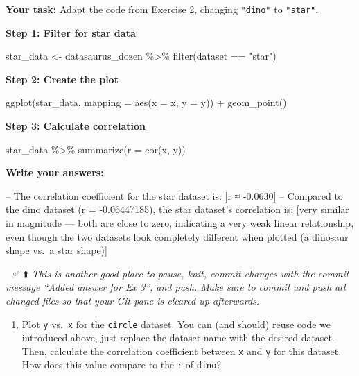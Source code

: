 \documentclass[]{tufte-handout}
\newenvironment{Shaded}{}{}
\newcommand{\AttributeTok}[1]{\textcolor[rgb]{0.49,0.56,0.16}{#1}}
\newcommand{\FunctionTok}[1]{\textcolor[rgb]{0.02,0.16,0.49}{#1}}
\newcommand{\NormalTok}[1]{#1}
\newcommand{\OtherTok}[1]{\textcolor[rgb]{0.00,0.44,0.13}{#1}}
\newcommand{\SpecialCharTok}[1]{\textcolor[rgb]{0.25,0.44,0.63}{#1}}
\newcommand{\StringTok}[1]{\textcolor[rgb]{0.25,0.44,0.63}{#1}}
\providecommand{\tightlist}{%
  \setlength{\itemsep}{0pt}\setlength{\parskip}{0pt}}
\begin{document}
\textbf{Your task:} Adapt the code from Exercise 2, changing
\texttt{"dino"} to \texttt{"star"}.

\textbf{Step 1: Filter for star data}

\begin{Shaded}
\begin{Highlighting}[]
\NormalTok{star\_data }\OtherTok{\textless{}{-}}\NormalTok{ datasaurus\_dozen }\SpecialCharTok{\%\textgreater{}\%}
  \FunctionTok{filter}\NormalTok{(dataset }\SpecialCharTok{==} \StringTok{"star"}\NormalTok{)}
\end{Highlighting}
\end{Shaded}

\textbf{Step 2: Create the plot}

\begin{Shaded}
\begin{Highlighting}[]
\FunctionTok{ggplot}\NormalTok{(star\_data, }\AttributeTok{mapping =} \FunctionTok{aes}\NormalTok{(}\AttributeTok{x =}\NormalTok{ x, }\AttributeTok{y =}\NormalTok{ y)) }\SpecialCharTok{+}
  \FunctionTok{geom\_point}\NormalTok{()}
\end{Highlighting}
\end{Shaded}

\textbf{Step 3: Calculate correlation}

\begin{Shaded}
\begin{Highlighting}[]
\NormalTok{star\_data }\SpecialCharTok{\%\textgreater{}\%}
  \FunctionTok{summarize}\NormalTok{(}\AttributeTok{r =} \FunctionTok{cor}\NormalTok{(x, y))}
\end{Highlighting}
\end{Shaded}

\textbf{Write your answers:}

-- The correlation coefficient for the star dataset is: {[}r ≈
-0.0630{]} -- Compared to the dino dataset (r = -0.06447185), the star
dataset's correlation is: {[}very similar in magnitude --- both are
close to zero, indicating a very weak linear relationship, even though
the two datasets look completely different when plotted (a dinosaur
shape vs.~a star shape){]}

🧶 ✅ ⬆️ \emph{This is another good place to pause, knit, commit changes
with the commit message ``Added answer for Ex 3'', and push. Make sure
to commit and push all changed files so that your Git pane is cleared up
afterwards.}

\begin{enumerate}
\def\labelenumi{\arabic{enumi}.}
\setcounter{enumi}{3}
\tightlist
\item
  Plot \texttt{y} vs.~\texttt{x} for the \texttt{circle} dataset. You
  can (and should) reuse code we introduced above, just replace the
  dataset name with the desired dataset. Then, calculate the correlation
  coefficient between \texttt{x} and \texttt{y} for this dataset. How
  does this value compare to the \texttt{r} of \texttt{dino}?
\end{enumerate}
\end{document}
